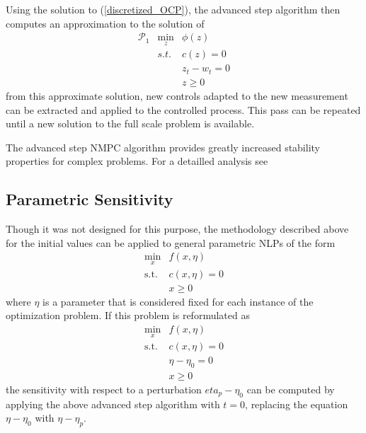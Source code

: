 \documentclass[a4paper]{article}
\begin{document}
Using the solution to (\ref{discretized_OCP}), the advanced step algorithm then computes an approximation to the solution of 
\begin{equation}
  \label{discretized_OCP_asnmpc}
  \begin{array}{ccc}
    \mathcal{P}_1 &\min\limits_z& \phi(z)\\
    &s.t.& c(z) = 0\\
    && z_t-w_t = 0\\
    && z\geq 0
  \end{array}
\end{equation}
from this approximate solution, new controls adapted to the new measurement can be extracted and applied to the controlled process. This pass can be repeated until a new solution to the full scale problem is available.

The advanced step NMPC algorithm provides greatly increased stability properties for complex problems. For a detailled analysis see \cite{Zavala2009, Zavala2008}
\subsection{Parametric Sensitivity}
Though it was not designed for this purpose, the methodology described above for the initial values can be applied to general parametric NLPs of the form
\begin{equation}
  \label{eq:parametric_NLP}
  \begin{array}{rc}
    \min\limits_x &f(x,\eta)\\
    \mathrm{s.t.}&c(x,\eta)=0\\
    &x\geq 0
  \end{array}
\end{equation}
where $\eta$ is a parameter that is considered fixed for each instance of the optimization problem. If this problem is reformulated as
\begin{equation}
  \label{eq:parametric_NLP_reformulated}
  \begin{array}{rc}
    \min\limits_x &f(x,\eta)\\
    \mathrm{s.t.}&c(x,\eta)=0\\
    &\eta-\eta_0=0\\
    &x\geq 0
  \end{array}
\end{equation}
the sensitivity with respect to a perturbation $eta_p - \eta_0$ can be computed by applying the above advanced step algorithm with $t=0$, replacing the equation $\eta-\eta_0$ with $\eta-\eta_p$.
\end{document}
